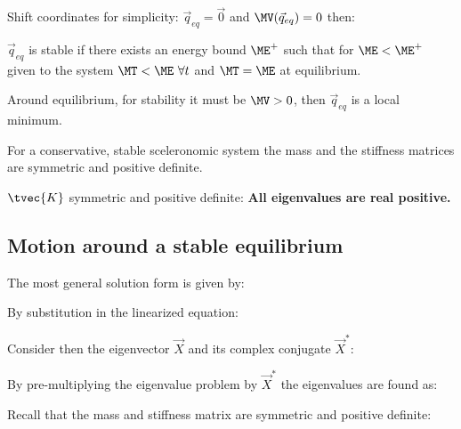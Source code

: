 \documentclass[10pt,a4paper]{scrartcl}
\begin{document}
\begin{multicols*}{2}
Shift coordinates for simplicity: $\vec{q}_{eq}=\vec{0}$ and $\MV(\vec{q}_{eq})=0$ then:

\vspace{3ex}

$\vec{q}_{eq}$ is stable if there exists an energy bound $\ME^+$ such that for $\ME<\ME^+$ given to the system $\MT<\ME\ \forall t$ and $\MT=\ME$ at equilibrium.


Around equilibrium, for stability it must be $\MV>0$, then $\vec{q}_{eq}$ is a local minimum.


For a conservative, stable sceleronomic system the mass and the stiffness matrices are symmetric and positive definite.


$\tvec{K}$ symmetric and positive definite: \textbf{All eigenvalues are real positive.}

\subsection{Motion around a stable equilibrium}


The most general solution form is given by:


By substitution in the linearized equation:


Consider then the eigenvector $\vec{X}$ and its complex conjugate $\vec{X}^\ast$:


By pre-multiplying the eigenvalue problem by $\vec{X}^\ast$ the eigenvalues are found as:


Recall that the mass and stiffness matrix are symmetric and positive definite:



\end{multicols*}
\end{document}
